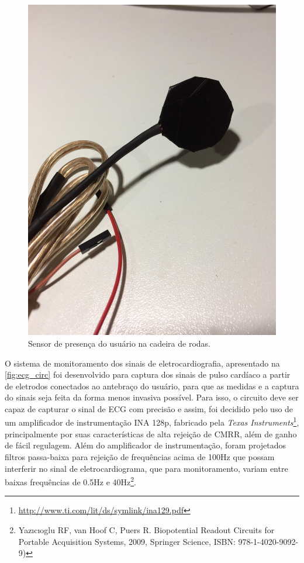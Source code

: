 \begin{figure}[h!]
    \begin{center}
        \includegraphics[scale=0.05]{figuras/fall_circ.jpg}
    \end{center}
    \caption{Sensor de presença do usuário na cadeira de rodas.}
    \label{fig:fall_ele}
\end{figure}

O sistema de monitoramento dos sinais de eletrocardiografia, apresentado na \ref{fig:ecg_circ}
foi desenvolvido para captura dos sinais de pulso cardíaco a partir de eletrodos
conectados ao antebraço do usuário, para que as medidas e a captura do sinais seja
feita da forma menos invasiva possível. Para isso, o circuito deve ser capaz de
capturar o sinal de ECG com precisão e assim, foi decidido pelo uso de um amplificador
de instrumentação INA 128p, fabricado pela \textit{Texas Instruments}\footnote{\url{http://www.ti.com/lit/ds/symlink/ina129.pdf}},
principalmente por suas características de alta rejeição de CMRR, além de ganho de fácil regulagem.
Além do amplificador de instrumentação, foram projetados filtros passa-baixa para
rejeição de frequências acima de 100Hz que possam interferir no sinal de eletrocardiograma,
que para monitoramento, variam entre baixas frequências de 0.5Hz e 40Hz\footnote{ Yazıcıoglu RF, van Hoof C,
Puers R. Biopotential Readout Circuits for Portable Acquisition Systems, 2009,
Springer Science, ISBN: 978-1-4020-9092-9)}.

